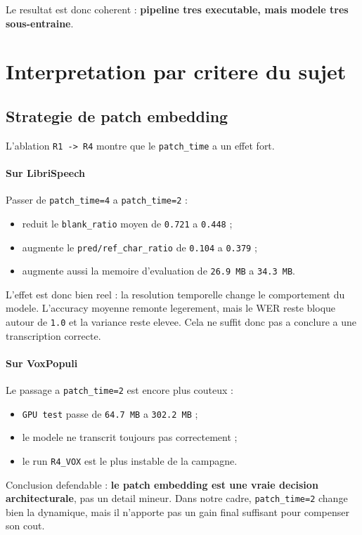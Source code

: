\documentclass[11pt,a4paper]{article}
\begin{document}
Le resultat est donc coherent : \textbf{pipeline tres executable, mais modele tres sous-entraine}.

\section{Interpretation par critere du sujet}
\subsection{Strategie de patch embedding}
L'ablation \texttt{R1 -> R4} montre que le \texttt{patch\_time} a un effet fort.

\paragraph{Sur LibriSpeech}
Passer de \texttt{patch\_time=4} a \texttt{patch\_time=2} :
\begin{itemize}[leftmargin=1.2cm]
\item reduit le \texttt{blank\_ratio} moyen de \texttt{0.721} a \texttt{0.448} ;
\item augmente le \texttt{pred/ref\_char\_ratio} de \texttt{0.104} a \texttt{0.379} ;
\item augmente aussi la memoire d'evaluation de \texttt{26.9 MB} a \texttt{34.3 MB}.
\end{itemize}

L'effet est donc bien reel : la resolution temporelle change le comportement du modele. L'accuracy moyenne remonte legerement, mais le WER reste bloque autour de \texttt{1.0} et la variance reste elevee. Cela ne suffit donc pas a conclure a une transcription correcte.

\paragraph{Sur VoxPopuli}
Le passage a \texttt{patch\_time=2} est encore plus couteux :
\begin{itemize}[leftmargin=1.2cm]
\item \texttt{GPU test} passe de \texttt{64.7 MB} a \texttt{302.2 MB} ;
\item le modele ne transcrit toujours pas correctement ;
\item le run \texttt{R4\_VOX} est le plus instable de la campagne.
\end{itemize}

Conclusion defendable : \textbf{le patch embedding est une vraie decision architecturale}, pas un detail mineur. Dans notre cadre, \texttt{patch\_time=2} change bien la dynamique, mais il n'apporte pas un gain final suffisant pour compenser son cout.
\end{document}
